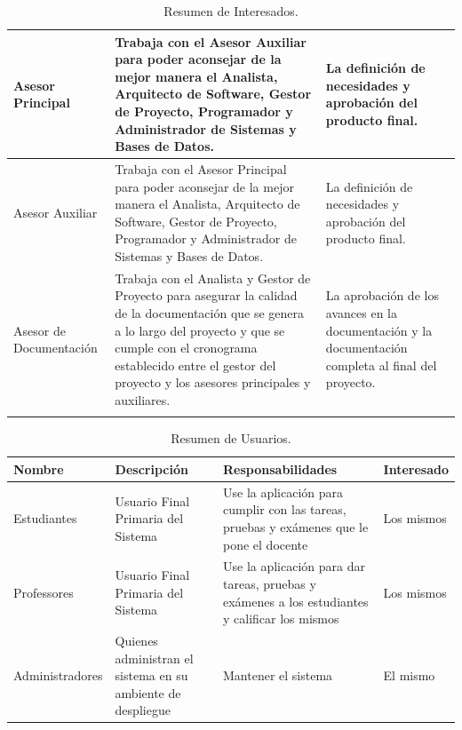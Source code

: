 \begin{longtable}{|p{}|p{}|p{}|}
  \hline
  Asesor Principal & Trabaja con el Asesor Auxiliar para poder aconsejar de la mejor manera el Analista, Arquitecto de Software, Gestor de Proyecto, Programador y Administrador de Sistemas y Bases de Datos. & La definición de necesidades y aprobación del producto final. \\
  \hline
  Asesor Auxiliar & Trabaja con el Asesor Principal para poder aconsejar de la mejor manera el Analista, Arquitecto de Software, Gestor de Proyecto, Programador y Administrador de Sistemas y Bases de Datos. & La definición de necesidades y aprobación del producto final. \\
  \hline
  Asesor de Documentación & Trabaja con el Analista y Gestor de Proyecto para asegurar la calidad de la documentación que se genera a lo largo del proyecto y que se cumple con el cronograma establecido entre el gestor del proyecto y los asesores principales y auxiliares. & La aprobación de los avances en la documentación y la documentación completa al final del proyecto. \\
  \hline
  \caption{Resumen de Interesados.}
  \label{res-inter}
\end{longtable}

\begin{table}[h!]
  \begin{tabular}{|p{}|p{}|p{}|p{}|}
    \hline
    \textbf{Nombre} & \textbf{Descripción} & \textbf{Responsabilidades} & \textbf{Interesado} \\
    \hline
    Estudiantes & Usuario Final Primaria del Sistema & Use la aplicación para cumplir con las tareas, pruebas y exámenes que le pone el docente & Los mismos \\
    \hline
    Professores & Usuario Final Primaria del Sistema & Use la aplicación para dar tareas, pruebas y exámenes a los estudiantes y calificar los mismos & Los mismos \\
    \hline
    Administradores & Quienes administran el sistema en su ambiente de despliegue & Mantener el sistema & El mismo \\
    \hline
  \end{tabular}
  \caption{Resumen de Usuarios.}
  \label{res-user}
\end{table}

